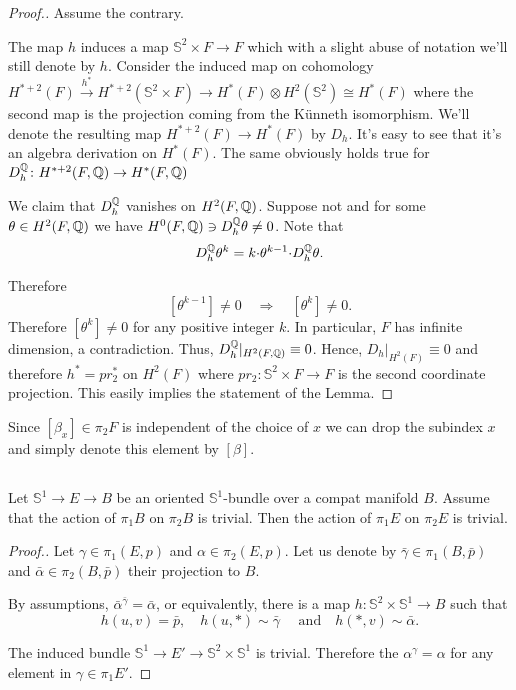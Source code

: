 \documentclass{amsart}
\begin{document}
\begin{proof}[Proof.] Assume the contrary. 

The map $h$ induces a map $\mathbb{S}^2\times F\to F$ which with a  slight abuse of notation we'll still denote by $h$. 
Consider the induced map on cohomology
$H^{*+2}(F)\overset{h^*}{\longrightarrow} H^{*+2}(\mathbb{S}^2\times F)\to H^*(F)\otimes H^2(\mathbb{S}^2)\cong  H^*(F)$ where the second map is the projection coming from the K\"unneth isomorphism.
We'll denote the resulting map $H^{*+2}(F)\to H^*(F)$ by $D_h$. It's easy to see that it's an algebra derivation on $H^*(F)$. The same obviously holds true for $D_h^{\mathbb{Q}}\colon H^{*+2}(F,\mathbb{Q})\to H^*(F,\mathbb{Q})$

 We claim that  $D_h^{\mathbb{Q}}$ vanishes on $H^2(F,\mathbb{Q})$. Suppose not and 
  for some 
$\theta\in H^2(F,\mathbb{Q})$ we have $H^0(F,\mathbb{Q})\ni D_h^{\mathbb{Q}}\theta\not=0$. 
Note that \[D_h^{\mathbb{Q}}\theta^k=k{\cdot} \theta^{k-1}{\cdot} D_h^{\mathbb{Q}}\theta.\] 




Therefore 
\[[\theta^{k-1}]\ne0
\quad
\Longrightarrow
\quad[\theta^{k}]\ne0.\]
Therefore $[\theta^{k}]\not=0$ for any positive integer $k$.
In particular, $F$ has infinite dimension, a contradiction. 
Thus, $D^{\mathbb{Q}}_h|_{H^2(F,\mathbb{Q})}\equiv 0$. Hence, $D_h|_{H^2(F)}\equiv 0$ and therefore $h^*=pr_2^*$ on $H^2(F)$ where $pr_2\colon \mathbb{S}^2\times F\to F$ is the second coordinate projection. 
This  easily implies the statement of the Lemma.
\end{proof}
\begin{rmk}
Since $[\beta_x] \in \pi_2F$ is independent of the choice of $x$ we can drop the subindex $x$ and simply denote this element by $[\beta]$.
\end{rmk} 

\subsection{}

\begin{claim}
Let $\mathbb{S}^1\to E\to B$ be an oriented $\mathbb{S}^1$-bundle over a compat manifold $B$.
Assume that the action of $\pi_1B$ 
on $\pi_2B$ is trivial. 
Then  the action of $\pi_1E$ on $\pi_2E$ is trivial.
\end{claim}

\begin{proof}[Proof.] 
Let $\gamma\in \pi_1(E,p)$ and $\alpha\in \pi_2(E,p)$. 
Let us denote by $\bar\gamma\in \pi_1(B,\bar p)$ and 
$\bar\alpha\in \pi_2(B,\bar p)$ their projection to $B$.

By assumptions, $\bar\alpha^{\bar\gamma}=\bar\alpha$, or equivalently, there is a  map
$h\colon \mathbb{S}^2\times \mathbb{S}^1\to B$ such that 
$$h(u,v)=\bar p,\quad
h(u,*)\sim\bar\gamma\quad\text{ and}\quad
h(*,v)\sim\bar\alpha.$$

The induced bundle $\mathbb{S}^1\to E'\to \mathbb{S}^2\times \mathbb{S}^1$ is trivial. 
Therefore the $\alpha^\gamma=\alpha$ 
for any element in $\gamma\in \pi_1E'$.
\end{proof}
\end{document}
